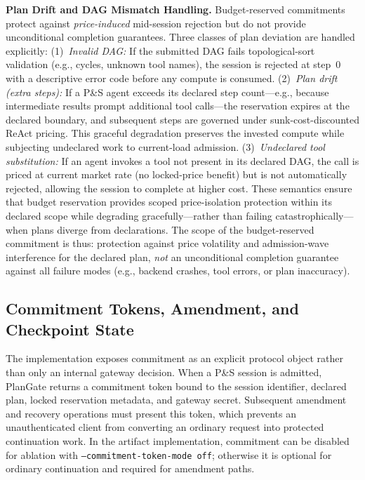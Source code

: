 \documentclass[sigconf,review,anonymous]{acmart}
\begin{document}
\textbf{Plan Drift and DAG Mismatch Handling.}
Budget-reserved commitments protect against \emph{price-induced} mid-session rejection but do not provide unconditional completion guarantees. Three classes of plan deviation are handled explicitly:
(1)~\emph{Invalid DAG:} If the submitted DAG fails topological-sort validation (e.g., cycles, unknown tool names), the session is rejected at step~0 with a descriptive error code before any compute is consumed.
(2)~\emph{Plan drift (extra steps):} If a P\&S agent exceeds its declared step count---e.g., because intermediate results prompt additional tool calls---the reservation expires at the declared boundary, and subsequent steps are governed under sunk-cost-discounted ReAct pricing. This graceful degradation preserves the invested compute while subjecting undeclared work to current-load admission.
(3)~\emph{Undeclared tool substitution:} If an agent invokes a tool not present in its declared DAG, the call is priced at current market rate (no locked-price benefit) but is not automatically rejected, allowing the session to complete at higher cost.
These semantics ensure that budget reservation provides scoped price-isolation protection within its declared scope while degrading gracefully---rather than failing catastrophically---when plans diverge from declarations. The scope of the budget-reserved commitment is thus: protection against price volatility and admission-wave interference for the declared plan, \emph{not} an unconditional completion guarantee against all failure modes (e.g., backend crashes, tool errors, or plan inaccuracy).

\subsection{Commitment Tokens, Amendment, and Checkpoint State}
\label{sec:commitment-tokens}

The implementation exposes commitment as an explicit protocol object rather than only an internal gateway decision. When a P\&S session is admitted, PlanGate returns a commitment token bound to the session identifier, declared plan, locked reservation metadata, and gateway secret. Subsequent amendment and recovery operations must present this token, which prevents an unauthenticated client from converting an ordinary request into protected continuation work. In the artifact implementation, commitment can be disabled for ablation with \texttt{--commitment-token-mode off}; otherwise it is optional for ordinary continuation and required for amendment paths.
\end{document}
